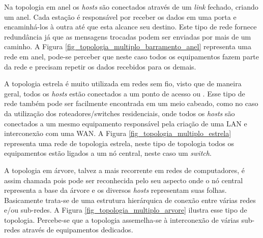 Na topologia em anel os \emph{hosts} são conectados através de um \emph{link} fechado, criando um anel. Cada estação é responsável por receber os dados em uma porta e encaminhá-los à outra até que esta alcance seu destino. Este tipo de rede fornece redundância já que as mensagens trocadas podem ser enviadas por mais de um caminho. A Figura \ref{fig_topologia_multiplo_barramento_anel} representa uma rede em anel, pode-se perceber que neste caso todos os equipamentos fazem parte da rede e precisam repetir os dados recebidos para os demais.


A topologia estrela é muito utilizada em redes sem fio, visto que de maneira geral, todos os \emph{hosts} estão conectados a um ponto de acesso ou . Esse tipo de rede também pode ser facilmente encontrada em um meio cabeado, como no caso da utilização dos roteadores/switches residenciais, onde todos os \emph{hosts} são conectados a um mesmo equipamento responsável pela criação de uma LAN e interconexão com uma WAN. A Figura \ref{fig_topologia_multiplo_estrela} representa uma rede de topologia estrela, neste tipo de topologia todos os equipamentos estão ligados a um nó central, neste caso um \emph{switch}.


A topologia em árvore, talvez a mais recorrente em redes de computadores, é assim chamada pois pode ser reconhecida pelo seu aspecto onde o nó central representa a base da árvore e os diversos \emph{hosts} representam suas folhas. Basicamente trata-se de uma estrutura hierárquica de conexão entre várias redes e/ou sub-redes. A Figura \ref{fig_topologia_multiplo_arvore} ilustra esse tipo de topologia. Percebe-se que a topologia assemelha-se à interconexão de várias sub-redes através de equipamentos dedicados.

